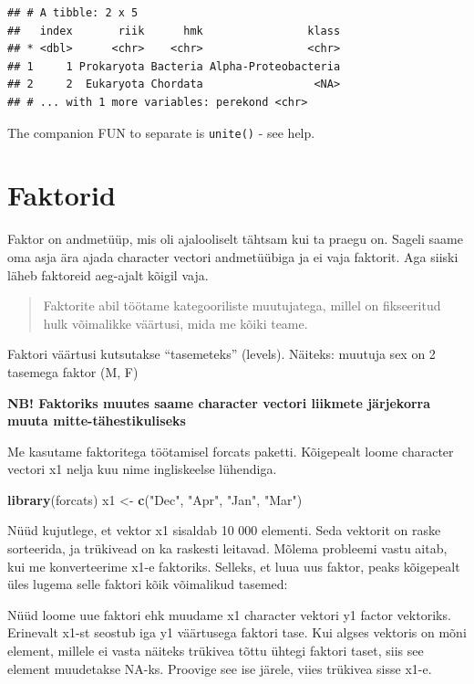 \documentclass[]{book}
\newenvironment{Shaded}{\begin{snugshade}}{\end{snugshade}}
\newcommand{\KeywordTok}[1]{\textcolor[rgb]{0.13,0.29,0.53}{\textbf{#1}}}
\newcommand{\StringTok}[1]{\textcolor[rgb]{0.31,0.60,0.02}{#1}}
\newcommand{\NormalTok}[1]{#1}
\begin{document}
\begin{verbatim}
## # A tibble: 2 x 5
##   index       riik      hmk                klass
## * <dbl>      <chr>    <chr>                <chr>
## 1     1 Prokaryota Bacteria Alpha-Proteobacteria
## 2     2  Eukaryota Chordata                 <NA>
## # ... with 1 more variables: perekond <chr>
\end{verbatim}

The companion FUN to separate is \texttt{unite()} - see help.

\section{Faktorid}\label{faktorid}

Faktor on andmetüüp, mis oli ajalooliselt tähtsam kui ta praegu on.
Sageli saame oma asja ära ajada character vectori andmetüübiga ja ei
vaja faktorit. Aga siiski läheb faktoreid aeg-ajalt kõigil vaja.

\begin{quote}
Faktorite abil töötame kategooriliste muutujatega, millel on fikseeritud
hulk võimalikke väärtusi, mida me kõiki teame.
\end{quote}

Faktori väärtusi kutsutakse ``tasemeteks'' (levels). Näiteks: muutuja
sex on 2 tasemega faktor (M, F)

\textbf{NB! Faktoriks muutes saame character vectori liikmete järjekorra
muuta mitte-tähestikuliseks}

Me kasutame faktoritega töötamisel forcats paketti. Kõigepealt loome
character vectori x1 nelja kuu nime ingliskeelse lühendiga.

\begin{Shaded}
\begin{Highlighting}[]
\KeywordTok{library}\NormalTok{(forcats)}
\NormalTok{x1 <-}\StringTok{ }\KeywordTok{c}\NormalTok{(}\StringTok{"Dec"}\NormalTok{, }\StringTok{"Apr"}\NormalTok{, }\StringTok{"Jan"}\NormalTok{, }\StringTok{"Mar"}\NormalTok{)}
\end{Highlighting}
\end{Shaded}

Nüüd kujutlege, et vektor x1 sisaldab 10 000 elementi. Seda vektorit on
raske sorteerida, ja trükivead on ka raskesti leitavad. Mõlema probleemi
vastu aitab, kui me konverteerime x1-e faktoriks. Selleks, et luua uus
faktor, peaks kõigepealt üles lugema selle faktori kõik võimalikud
tasemed:

Nüüd loome uue faktori ehk muudame x1 character vektori y1 factor
vektoriks. Erinevalt x1-st seostub iga y1 väärtusega faktori tase. Kui
algses vektoris on mõni element, millele ei vasta näiteks trükivea tõttu
ühtegi faktori taset, siis see element muudetakse NA-ks. Proovige see
ise järele, viies trükivea sisse x1-e.
\end{document}
